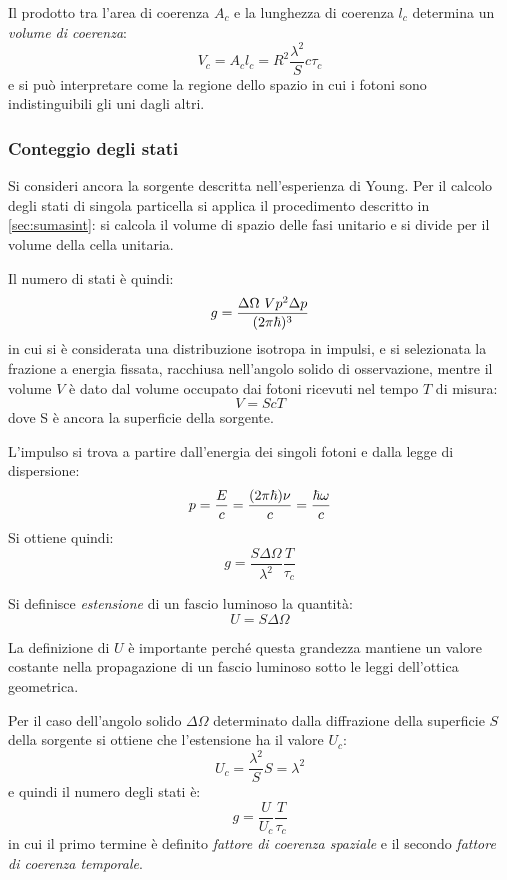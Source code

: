 Il prodotto tra l'area di coerenza $ A_c $ e la lunghezza di coerenza $ l_c $ determina un \textit{volume di coerenza}:
\[ V_c = A_c l_c = R^2 \frac{\lambda^2}{S} c \tau_c\]
e si può interpretare come la regione dello spazio in cui i fotoni sono indistinguibili gli uni dagli altri.

\subsubsection{Conteggio degli stati}

Si consideri ancora la sorgente descritta nell'esperienza di Young. Per il calcolo degli stati di singola particella si applica il procedimento descritto in \cref{sec:sumasint}: si calcola il volume di spazio delle fasi unitario e si divide per il volume della cella unitaria.

Il numero di stati è quindi:
\[ g = \frac{\Delta\Omega ~V p^2 \Delta p}{(2\pi \hbar)^3} \]
in cui si è considerata una distribuzione isotropa in impulsi, e si selezionata la frazione a energia fissata, racchiusa nell'angolo solido di osservazione, mentre il volume $ V $ è dato dal volume occupato dai fotoni ricevuti nel tempo $ T $ di misura:
\[ V = S c T \]
\noindent dove S è ancora la superficie della sorgente.

L'impulso si trova a partire dall'energia dei singoli fotoni e dalla legge di dispersione:
\[ p = \frac{E}{c} = \frac{(2\pi \hbar)\nu}{c} = \frac{\hbar \omega}{c} \]
Si ottiene quindi:
\[ g = \frac{S \Delta\Omega}{\lambda^2} \frac{T}{\tau_c} \]

\begin{defn}
	Si definisce \textit{estensione} di un fascio luminoso la quantità:
	\begin{equation*}
	U = S \Delta\Omega
	\end{equation*}
\end{defn}
La definizione di $ U $ è importante perché questa grandezza mantiene un valore costante nella propagazione di un fascio luminoso sotto le leggi dell'ottica geometrica.

Per il caso dell'angolo solido $ \Delta\Omega $ determinato dalla diffrazione della superficie $ S $ della sorgente si ottiene che l'estensione ha il valore $ U_c $:
\[ U_c = \frac{\lambda^2}{S} S = \lambda^2 \]
e quindi il numero degli stati è:
\[ g = \frac{U}{U_c} \frac{T}{\tau_c} \]
in cui il primo termine è definito \textit{fattore di coerenza spaziale} e il secondo \textit{fattore di coerenza temporale}.

